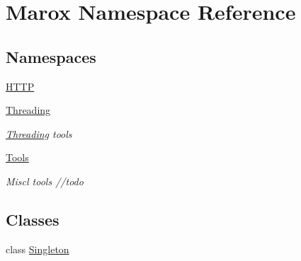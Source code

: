 \hypertarget{namespace_marox}{}\section{Marox Namespace Reference}
\label{namespace_marox}
\subsection*{Namespaces}
\begin{DoxyCompactItemize}
\item 
 \hyperlink{namespace_marox_1_1_h_t_t_p}{H\+T\+T\+P}
\item 
 \hyperlink{namespace_marox_1_1_threading}{Threading}
\begin{DoxyCompactList}\small\item\em \hyperlink{namespace_marox_1_1_threading}{Threading} tools \end{DoxyCompactList}\item 
 \hyperlink{namespace_marox_1_1_tools}{Tools}
\begin{DoxyCompactList}\small\item\em Miscl tools //todo \end{DoxyCompactList}\end{DoxyCompactItemize}
\subsection*{Classes}
\begin{DoxyCompactItemize}
\item 
class \hyperlink{class_marox_1_1_singleton}{Singleton}
\end{DoxyCompactItemize}
